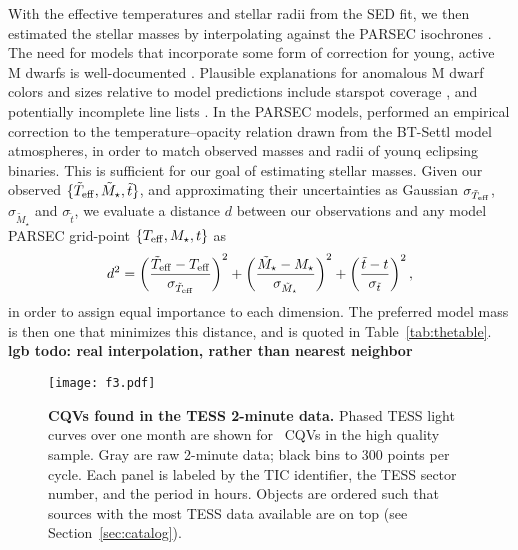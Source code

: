 \documentclass[11pt,twocolumn,tighten]{aastex63}
\begin{document}
With the effective temperatures and stellar radii from the SED fit, we
then estimated the stellar masses by interpolating against the PARSEC
isochrones \citep[v1.2S][]{2014MNRAS.444.2525C}.  The need for models
that incorporate some form of correction for young, active M dwarfs is
well-documented
\citep[e.g.][]{2012ApJ...756...47S,2015ApJ...804..146D,2016A&A...593A..99F,2020ApJ...891...29S}.
Plausible explanations for anomalous M dwarf colors and sizes relative
to model predictions include starspot coverage
\citep[e.g.][]{2017ApJ...836..200G}, and potentially incomplete line
lists \citep[e.g.][]{2013A&A...556A..15R}.  In the PARSEC models,
\citet{2014MNRAS.444.2525C} performed an empirical correction to the
temperature--opacity relation drawn from the BT-Settl model
atmospheres, in order to match observed masses and radii of younq
eclipsing binaries.  This is sufficient for our goal of estimating
stellar masses.  Given our observed $\{ \tilde{T}_{\rm eff},
\tilde{M}_\star, \tilde{t} \}$, and approximating their uncertainties
as Gaussian $\sigma_{\tilde{T}_{\rm eff}}$, $\sigma_{\tilde{M}_\star}$
and $\sigma_{\tilde{t}}$, we evaluate a distance $d$ between our
observations and any model PARSEC grid-point $\{ T_{\rm eff}, M_\star,
t \}$ as
\begin{equation}
  d^2 = 
  \left( \frac{\tilde{T}_{\rm eff} - T_{\rm eff}}{\sigma_{\tilde{T}_{\rm eff}}} \right)^2
  +
  \left( \frac{\tilde{M}_{\star} - M_{\star}}{\sigma_{\tilde{M}_{\star}}} \right)^2
  +
  \left( \frac{\tilde{t} - t}{\sigma_{\tilde{t}}} \right)^2,
\end{equation}
in order to assign equal importance to each dimension.  The preferred
model mass is then one that minimizes this distance, and is quoted in
Table~\ref{tab:thetable}.
{\bf lgb todo: real interpolation, rather than nearest neighbor}


\begin{figure*}[!tp]
	\begin{center}
		\centering
		\texttt{[image: f3.pdf]}
    \vspace{-0.3cm}
		\caption{
      {\bf CQVs found in the TESS 2-minute data.}
      Phased TESS light curves over one month are shown for \ngoods\
      CQVs in the high quality sample.  Gray are raw 2-minute data;
      black bins to 300 points per cycle.  Each panel is labeled by
      the TIC identifier, the TESS sector number, and the period in
      hours.  Objects are ordered such that sources with the most TESS
      data available are on top (see Section~\ref{sec:catalog}).
		}
		\label{fig:cqvs}
	\end{center}
\end{figure*}
\end{document}
